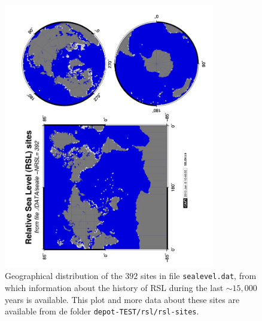 \documentclass[11pt,fleqn,a4paper,titlepage]{article}
\begin{document}
\begin{figure}[h]
\begin{center}
\includegraphics[width=0.82\textwidth, angle=-90]{./Figures/maprsl.png}
\caption[RSL sites]{\small{Geographical distribution of the $392$ sites in file \texttt{sealevel.dat}, from which information about the history of RSL during the last $\sim 15,000$ years is available. This plot 
and more data about these sites are available from de folder \texttt{depot-TEST/rsl/rsl-sites}}.}
\label{fig:rsl-sites}
\end{center}
\end{figure}
\clearpage
\end{document}
